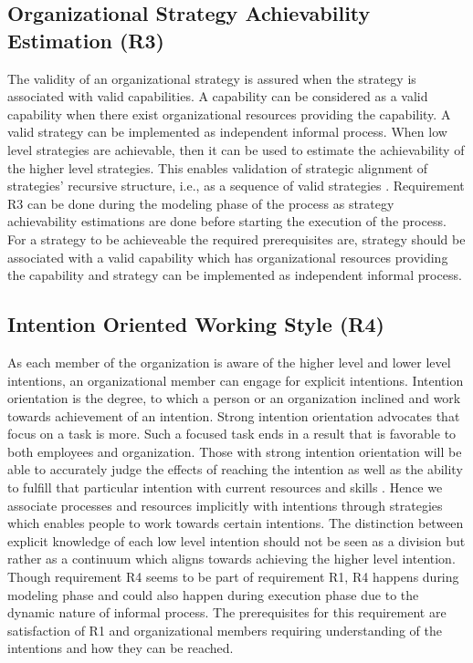 \subsection{Organizational Strategy Achievability Estimation (R3)}
 The validity of an organizational strategy is assured when the strategy is associated with valid capabilities. A capability can be considered as a valid capability when there exist organizational resources providing the capability. A valid strategy can be implemented as independent informal process. When low level strategies are achievable, then it can be used to estimate the achievability of the higher level strategies. This enables validation of strategic alignment of strategies' recursive structure, i.e., as a sequence of valid strategies \cite{Bleistein2006}. Requirement R3  can be done during the modeling phase of the process as strategy achievability estimations are done before starting the execution of the process. For a strategy to be achieveable the required prerequisites are, strategy should be associated with a valid capability which has organizational resources providing the capability and strategy can be implemented as independent informal process.
 
\subsection{Intention Oriented Working Style (R4)}
As each member of the organization is aware of the higher level and lower level intentions, an organizational member can engage for explicit intentions. Intention orientation is the degree, to which a person or an organization inclined and work towards achievement of an intention. Strong intention orientation advocates that focus on a task is more. Such a focused task ends in a result that is favorable to both employees and organization. Those with strong intention orientation will be able to accurately judge the effects of reaching the intention as well as the ability to fulfill that particular intention with current resources and skills \cite{Lacom}. Hence we associate processes and resources implicitly with intentions through strategies which enables people to work towards certain intentions. The distinction between explicit knowledge of each low level intention should not be seen as a division but rather as a continuum which aligns towards achieving the higher level intention. Though requirement R4 seems to be part of requirement R1, R4 happens during modeling phase and could also happen during execution phase due to the dynamic nature of informal process. The prerequisites for this requirement are satisfaction of R1 and organizational members requiring understanding of the intentions and how they can be reached.  

